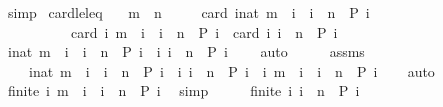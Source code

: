 \begin{isabellebody}
\ simp\isanewline
{}\isamarkupfalse%
%
\endisatagproof
{\isafoldproof}%
%
\isadelimproof
\isanewline
%
\endisadelimproof
\isanewline
{}\isamarkupfalse%
\ card{\isacharunderscore}le{\isacharunderscore}leq{\isacharcolon}\isanewline
\ \ \ {\isacartoucheopen}m\ {\isacharless}\ n{\isacartoucheclose}\isanewline
\ \ \ \ \ {\isacartoucheopen}card\ {\isacharbraceleft}i{\isacharcolon}{\isacharcolon}nat{\isachardot}\ m\ {\isacharless}\ i\ {\isasymand}\ i\ {\isasymle}\ n\ {\isasymand}\ P\ i{\isacharbraceright}\isanewline
\ \ \ \ \ \ \ \ \ {\isacharequal}\ card\ {\isacharbraceleft}i{\isachardot}\ m\ {\isacharless}\ i\ {\isasymand}\ i\ {\isacharless}\ n\ {\isasymand}\ P\ i{\isacharbraceright}\ {\isacharplus}\ card\ {\isacharbraceleft}i{\isachardot}\ i\ {\isacharequal}\ n\ {\isasymand}\ P\ i{\isacharbraceright}{\isacartoucheclose}\isanewline
%
\isadelimproof
%
\endisadelimproof
%
\isatagproof
{}\isamarkupfalse%
\ {\isacharminus}\isanewline
\ \ \isamarkupfalse%
\ {\isacartoucheopen}{\isacharbraceleft}i{\isacharcolon}{\isacharcolon}nat{\isachardot}\ m\ {\isacharless}\ i\ {\isasymand}\ i\ {\isacharless}\ n\ {\isasymand}\ P\ i{\isacharbraceright}\ {\isasyminter}\ {\isacharbraceleft}i{\isachardot}\ i\ {\isacharequal}\ n\ {\isasymand}\ P\ i{\isacharbraceright}\ {\isacharequal}\ {\isacharbraceleft}{\isacharbraceright}{\isacartoucheclose}\ \isamarkupfalse%
\ auto\isanewline
\ \ \isamarkupfalse%
\ \isamarkupfalse%
\ assms\ \isamarkupfalse%
\isanewline
\ \ \ \ {\isacartoucheopen}{\isacharbraceleft}i{\isacharcolon}{\isacharcolon}nat{\isachardot}\ m\ {\isacharless}\ i\ {\isasymand}\ i\ {\isacharless}\ n\ {\isasymand}\ P\ i{\isacharbraceright}\ {\isasymunion}\ {\isacharbraceleft}i{\isachardot}\ i\ {\isacharequal}\ n\ {\isasymand}\ P\ i{\isacharbraceright}\ {\isacharequal}\ {\isacharbraceleft}i{\isachardot}\ m\ {\isacharless}\ i\ {\isasymand}\ i\ {\isasymle}\ n\ {\isasymand}\ P\ i{\isacharbraceright}{\isacartoucheclose}\isanewline
\ \ \isamarkupfalse%
\ auto\isanewline
\ \ \isamarkupfalse%
\ \isamarkupfalse%
\ {\isacartoucheopen}finite\ {\isacharbraceleft}i{\isachardot}\ m\ {\isacharless}\ i\ {\isasymand}\ i\ {\isacharless}\ n\ {\isasymand}\ P\ i{\isacharbraceright}{\isacartoucheclose}\ \isamarkupfalse%
\ simp\isanewline
\ \ \isamarkupfalse%
\ \isamarkupfalse%
\ {\isacartoucheopen}finite\ {\isacharbraceleft}i{\isachardot}\ i\ {\isacharequal}\ n\ {\isasymand}\ P\ i{\isacharbraceright}{\isacartoucheclose}\ \isamarkupfalse%

\end{isabellebody}
